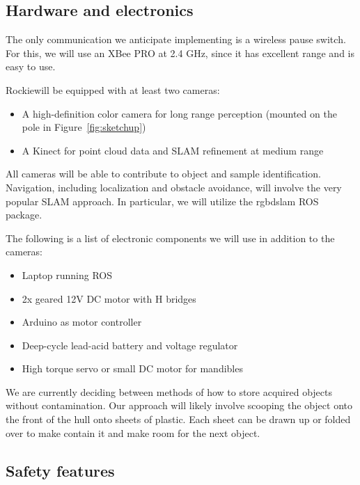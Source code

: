 \documentclass{paper}
\newcommand \robotName{Rockie} 		%
\begin{document}
\subsection*{Hardware and electronics}

	The only communication we anticipate implementing is a wireless pause switch.  For this, we will use an XBee PRO at 2.4 GHz, since it has excellent range and is easy to use.

	\robotName\text{ }will be equipped with at least two cameras: 
\begin{itemize}
	\item A high-definition color camera for long range perception (mounted on the pole in Figure~\ref{fig:sketchup})
	\item A Kinect for point cloud data and SLAM refinement at medium range
\end{itemize}
All cameras will be able to contribute to object and sample identification.  
	Navigation, including localization and obstacle avoidance, will involve the very popular SLAM approach.  In particular, we will utilize the rgbdslam ROS package.  


	The following is a list of electronic components we will use in addition to the cameras:
\begin{itemize}
	\item Laptop running ROS
	\item 2x geared 12V DC motor with H bridges
	\item Arduino as motor controller
	\item Deep-cycle lead-acid battery and voltage regulator
	\item High torque servo or small DC motor for mandibles 
\end{itemize}
We are currently deciding between methods of how to store acquired objects without contamination.  Our approach will likely involve scooping the object onto the front of the hull onto sheets of plastic.  Each sheet can be drawn up or folded over to make contain it and make room for the next object.  



\subsection*{Safety features}
\end{document}
